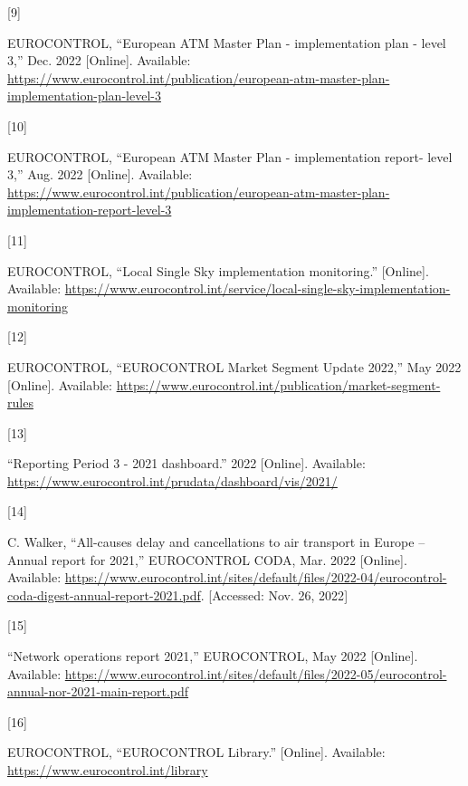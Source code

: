 \documentclass[
  11pt,
  a4paper,
]{book}
\newlength{\cslhangindent}
\newlength{\csllabelwidth}
\newlength{\cslentryspacingunit} %
\newenvironment{CSLReferences}[2] %
 {%
  \setlength{\parindent}{0pt}
  \ifodd #1
  \let\oldpar\par
  \def\par{\hangindent=\cslhangindent\oldpar}
  \fi
  \setlength{\parskip}{#2\cslentryspacingunit}
 }%
 {}
\newcommand{\CSLLeftMargin}[1]{\parbox[t]{\csllabelwidth}{#1}}
\newcommand{\CSLRightInline}[1]{\parbox[t]{\linewidth - \csllabelwidth}{#1}\break}
\begin{document}
\begin{CSLReferences}{0}{0}
\leavevmode{}%
\CSLLeftMargin{{[}9{]} }%
\CSLRightInline{EUROCONTROL, {``European {ATM Master Plan} -
implementation plan - level 3,''} Dec. 2022 {[}Online{]}. Available:
\url{https://www.eurocontrol.int/publication/european-atm-master-plan-implementation-plan-level-3}}

\leavevmode{}%
\CSLLeftMargin{{[}10{]} }%
\CSLRightInline{EUROCONTROL, {``European {ATM Master Plan} -
implementation report- level 3,''} Aug. 2022 {[}Online{]}. Available:
\url{https://www.eurocontrol.int/publication/european-atm-master-plan-implementation-report-level-3}}

\leavevmode{}%
\CSLLeftMargin{{[}11{]} }%
\CSLRightInline{EUROCONTROL, {``Local {Single Sky} implementation
monitoring.''} {[}Online{]}. Available:
\url{https://www.eurocontrol.int/service/local-single-sky-implementation-monitoring}}

\leavevmode{}%
\CSLLeftMargin{{[}12{]} }%
\CSLRightInline{EUROCONTROL, {``{EUROCONTROL Market Segment Update}
2022,''} May 2022 {[}Online{]}. Available:
\url{https://www.eurocontrol.int/publication/market-segment-rules}}

\leavevmode{}%
\CSLLeftMargin{{[}13{]} }%
\CSLRightInline{{``Reporting {Period} 3 - 2021 dashboard.''} 2022
{[}Online{]}. Available:
\url{https://www.eurocontrol.int/prudata/dashboard/vis/2021/}}

\leavevmode{}%
\CSLLeftMargin{{[}14{]} }%
\CSLRightInline{C. Walker, {``All-causes delay and cancellations to air
transport in {Europe} -- {Annual} report for 2021,''} {EUROCONTROL
CODA}, Mar. 2022 {[}Online{]}. Available:
\url{https://www.eurocontrol.int/sites/default/files/2022-04/eurocontrol-coda-digest-annual-report-2021.pdf}.
{[}Accessed: Nov. 26, 2022{]}}

\leavevmode{}%
\CSLLeftMargin{{[}15{]} }%
\CSLRightInline{{``Network operations report 2021,''} {EUROCONTROL}, May
2022 {[}Online{]}. Available:
\url{https://www.eurocontrol.int/sites/default/files/2022-05/eurocontrol-annual-nor-2021-main-report.pdf}}

\leavevmode{}%
\CSLLeftMargin{{[}16{]} }%
\CSLRightInline{EUROCONTROL, {``{EUROCONTROL Library}.''} {[}Online{]}.
Available: \url{https://www.eurocontrol.int/library}}


\end{CSLReferences}
\end{document}
